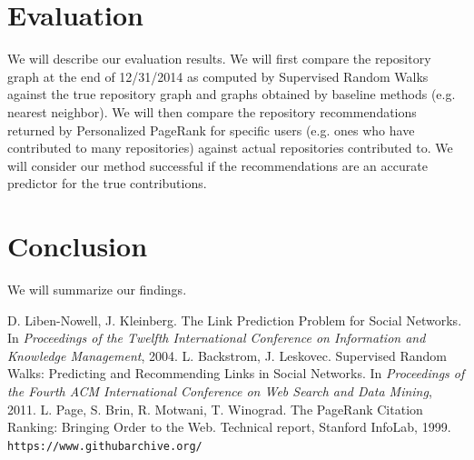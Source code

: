 \documentclass[10pt]{article}
\begin{document}
\begin{multicols}{2}
\section{Evaluation}

We will describe our evaluation results. We will first compare the repository graph at the end of 12/31/2014 as computed by Supervised Random Walks against the true repository graph and graphs obtained by baseline methods (e.g. nearest neighbor). We will then compare the repository recommendations returned by Personalized PageRank for specific users (e.g. ones who have contributed to many repositories) against actual repositories contributed to. We will consider our method successful if the recommendations are an accurate predictor for the true contributions.

\section{Conclusion}

We will summarize our findings.

\begin{thebibliography}{9}
 D. Liben-Nowell, J. Kleinberg. The Link Prediction Problem for Social Networks. In \textit{Proceedings of the Twelfth International Conference on Information and Knowledge Management}, 2004.
 L. Backstrom, J. Leskovec. Supervised Random Walks: Predicting and Recommending Links in Social Networks. In \textit{Proceedings of the Fourth ACM International Conference on Web Search and Data Mining}, 2011.
  L. Page, S. Brin, R. Motwani, T. Winograd. The
PageRank Citation Ranking: Bringing Order to the Web.
Technical report, Stanford InfoLab, 1999.
 \verb|https://www.githubarchive.org/|
\end{thebibliography}

\end{multicols}
\end{document}
